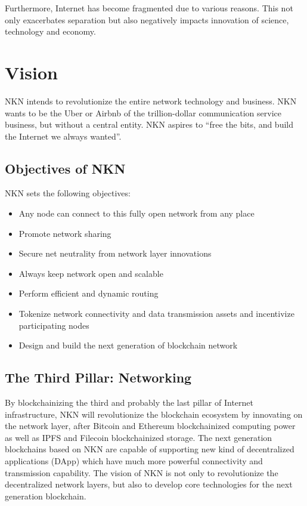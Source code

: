 \documentclass[reprint,pre,aps]{revtex4-1}
\begin{document}
Furthermore, Internet has become fragmented due to various reasons. This not only exacerbates separation but also negatively impacts innovation of science, technology and economy.

\section{Vision}

NKN intends to revolutionize the entire network technology and business. NKN wants to be the Uber or Airbnb of the trillion-dollar communication service business, but without a central entity. NKN aspires to “free the bits, and build the Internet we always wanted”.

\subsection{Objectives of NKN}

NKN sets the following objectives:

\begin{itemize}
\item Any node can connect to this fully open network from any place
\item Promote network sharing
\item Secure net neutrality from network layer innovations
\item Always keep network open and scalable
\item Perform efficient and dynamic routing
\item Tokenize network connectivity and data transmission assets and incentivize participating nodes
\item Design and build the next generation of blockchain network
\end{itemize}

\subsection{The Third Pillar: Networking}

By blockchainizing the third and probably the last pillar of Internet infrastructure, NKN will revolutionize  the blockchain ecosystem by innovating on the network layer, after Bitcoin \cite{nakamoto2008bitcoin} and Ethereum \cite{buterin2014next} blockchainized computing power as well as IPFS \cite{benet2014ipfs} and Filecoin\cite{filecoin} blockchainized storage. The next generation blockchains based on NKN are capable of supporting new kind of decentralized applications (DApp) which have much more powerful connectivity and transmission capability. The vision of NKN is not only to revolutionize the decentralized network layers, but also to develop core technologies for the next generation blockchain.
\end{document}
